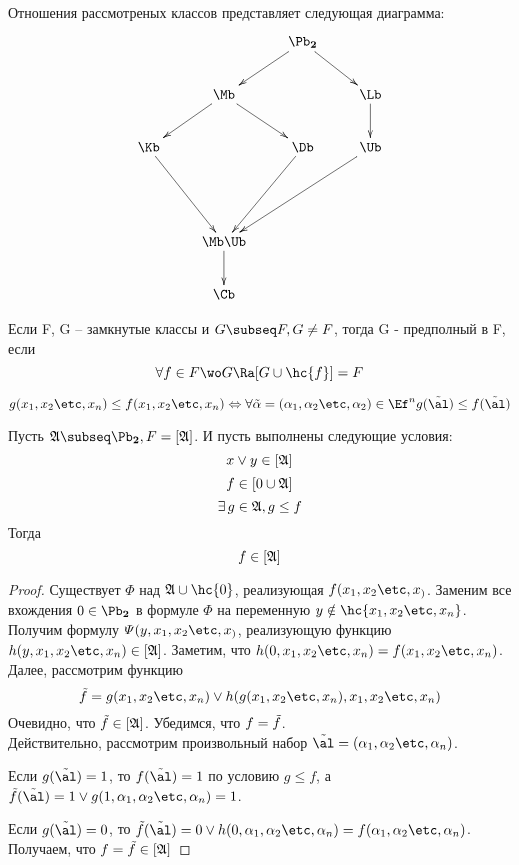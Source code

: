 \documentclass[unicode,10pt]{article}
\begin{document}
Отношения рассмотреных классов представляет следующая диаграмма:
\begin{displaymath}
  \xymatrix{
    &&\ar[ld] \PD \ar[rd]&\\
    &\ar[ld]\Mb\ar[rd]&&\Lb\ar[d]\\
    \Kb\ar[ddr]&&\Db\ar[ddl]&\Ub\ar[lldd]\\
    &&&\\
    &\Mb\Ub\ar[d]&&\\
    &\Cb&&\\
  }
\end{displaymath}
\begin{df}
  Если F, G -- замкнутые классы и $G \subseq F, G \neq F$, тогда G - предполный в F, если
  \begin{displaymath}
    \forall f \in F\wo G \Ra [G\cup\hc{f}] = F
  \end{displaymath}
\end{df}
\begin{df}
  \begin{displaymath}
    g(\set[x]{n}) \le f(\set[x]{n}) \Leftrightarrow \allset{n} g(\alt) \le f(\alt)
  \end{displaymath}
\end{df}
\begin{lemma}
  Пусть $\ag \subseq \PD, F = [\ag]$. И пусть выполнены следующие условия:
  \label{ast}
  \begin{equation*}
      x\vee{y} \in [\mathfrak{A}]
  \end{equation*}
  \begin{equation*}
      f \in [{0} \cup \mathfrak{A}]
  \end{equation*}
  \begin{equation*}
    \exists\, g \in \mathfrak{A}, g \le f
  \end{equation*}
  Тогда
  \begin{displaymath}
    f \in [\mathfrak{A}]
  \end{displaymath}
\end{lemma}
\begin{proof}
  Существует $\varPhi$ над $\ag \cup \hc{0}$, реализующая $f(\set[x])$.
  Заменим все вхождения $0\in\PD$ в формуле $\varPhi$ на переменную $y \notin \hc{\set[x]{n}}$.
  Получим формулу $\varPsi(y,\set[x])$, реализующую функцию $h(y,\set[x]{n}) \in [\ag]$.
  Заметим, что $h(0,\set[x]{n}) = f(\set[x]{n})$.
  Далее, рассмотрим функцию
  \begin{displaymath}
    \tilde f = g(\set[x]{n}) \vee h(g(\set[x]{n}), \set[x]{n})
  \end{displaymath}
  Очевидно, что $\tilde{f} \in [\mathfrak{A}]$. Убедимся, что $f = \tilde{f}$.\\
  Действительно, рассмотрим произвольный набор $\alt =(\set{n})$.
  \par Если $g(\alt) = 1$, то $f(\alt) = 1$ по условию $g \le f$, а $\tilde f(\tilde \al) = 1 \vee g(1,\set{n}) =1$.
  \par Если $g(\alt) = 0$, то $\tf(\alt) =0 \vee h(0,\set{n}) =f(\set{n})$.\\
  Получаем, что $ f = \tilde{f} \in [\mathfrak{A}]$
\end{proof}
\end{document}
